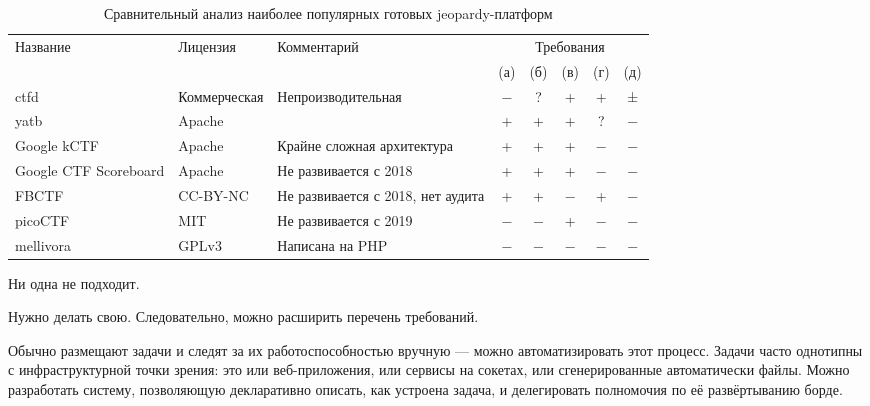 \begin{center}
  \begin{longtable}{|p{}|p{}|p{}|c|c|c|c|c|}
    \caption{Сравнительный анализ наиболее популярных готовых jeopardy-платформ}
    \label{tab:boards}
    \\ \hline
    \multirow{2}{*}{Название} & \multirow{2}{*}{Лицензия} & \multirow{2}{*}{Комментарий} & \multicolumn{5}{c|}{Требования} \\ \cline{4-8}
                              &                           &                              & (а) & (б) & (в) & (г) & (д) \\
    \hline \endhead
    ctfd                  & Коммерческая & \small{Непроизводительная}                     & − & ? & + & + & ± \\
    \hline
    yatb                  & Apache       &                                                & + & + & + & ? & − \\
    \hline
    Google kCTF           & Apache       & \small{Крайне сложная архитектура}             & + & + & + & − & − \\
    \hline
    Google CTF Scoreboard & Apache       & \small{Не развивается с 2018     }             & + & + & + & − & − \\
    \hline
    FBCTF                 & CC-BY-NC     & \small{Не развивается с 2018, нет аудита     } & + & + & − & + & − \\
    \hline
    picoCTF               & MIT          & \small{Не развивается с 2019     }             & − & − & + & − & − \\
    \hline
    mellivora             & GPLv3        & \small{Написана на PHP           }             & − & − & − & − & − \\
    \hline
  \end{longtable}
\end{center}

Ни одна не подходит.

Нужно делать свою. Следовательно, можно расширить перечень требований.

Обычно размещают задачи и следят за их работоспособностью вручную — можно автоматизировать этот процесс. Задачи часто однотипны с инфраструктурной точки зрения: это или веб-приложения, или сервисы на сокетах, или сгенерированные автоматически файлы. Можно разработать систему, позволяющую декларативно описать, как устроена задача, и делегировать полномочия по её развёртыванию борде.

